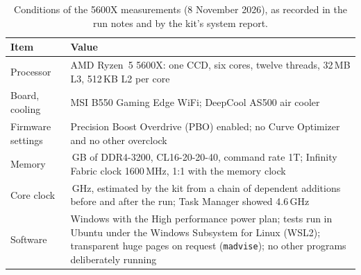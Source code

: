 \begin{table}[htbp]
  \centering
  \caption[Conditions of the 5600X measurements]{Conditions of the 5600X measurements (8 November 2026), as recorded in the run notes and by the kit's system report.}
  \label{tab:m5600x-conditions}
  \small
  \begin{tabularx}{\textwidth}{@{}>{\raggedright\arraybackslash}p{4.2cm}>{\raggedright\arraybackslash}X@{}}
    \toprule
    \textbf{Item} & \textbf{Value} \\
    \midrule
    Processor & AMD Ryzen~5 5600X: one CCD, six cores, twelve threads, 32\,MB L3, 512\,KB L2 per core \\
    Board, cooling & MSI B550 Gaming Edge WiFi; DeepCool AS500 air cooler \\
    Firmware settings & Precision Boost Overdrive (PBO) enabled; no Curve Optimizer and no other overclock \\
    Memory & 32\,GB of DDR4-3200, CL16-20-20-40, command rate 1T; Infinity Fabric clock 1600\,MHz, 1:1 with the memory clock \\
    Core clock & 4.614\,GHz, estimated by the kit from a chain of dependent additions before and after the run; Task Manager showed 4.6\,GHz \\
    Software & Windows with the High performance power plan; tests run in Ubuntu under the Windows Subsystem for Linux (WSL2); transparent huge pages on request (\texttt{madvise}); no other programs deliberately running \\
    \bottomrule
  \end{tabularx}
\end{table}

